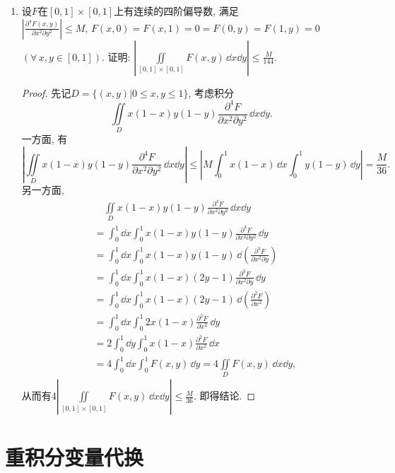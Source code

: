\begin{quizb}
\begin{enumerate}
\item 设\(F\)在\([0,1]\times [0,1]\)上有连续的四阶偏导数, 
满足\(\left|\frac{\partial^4F(x,y)}{\partial x^2\partial y^2}\right|\leqslant M,\,F(x,0)=F(x,1)=0=F(0,y)=F(1,y)=0\) \((\forall\, x,y\in[0,1])\). 
证明: \(\left|\iint\limits_{[0,1]\times [0,1]}F(x,y)\,\dd x\dd y\right|\leqslant\frac{M}{144}\).
\begin{proof}
先记\(D=\{(x,y)\big|0\leqslant x,y\leqslant 1\}\), 
考虑积分\[\iint\limits_{D}x(1-x)y(1-y)\frac{\partial^4F}{\partial x^2\partial y^2}\,\dd x\dd y.\]
一方面, 有
\[\left|\iint\limits_{D}x(1-x)y(1-y)\frac{\partial^4F}{\partial x^2\partial y^2}\,\dd x\dd y\right|
\leqslant\left|M\int_{0}^{1}x(1-x)\,\dd x\int_{0}^{1}y(1-y)\,\dd y\right|
=\frac{M}{36}.\]另一方面,\[\begin{split}
&\quad\iint\limits_{D}x(1-x)y(1-y)\frac{\partial^4F}{\partial x^2\partial y^2}\,\dd x\dd y\\
&=\int_{0}^{1}\dd x\int_{0}^{1}x(1-x)y(1-y)\frac{\partial^4F}{\partial x^2\partial y^2}\,\dd y\\
&=\int_{0}^{1}\dd x\int_{0}^{1}x(1-x)y(1-y)\,\dd\left(\frac{\partial^3F}{\partial x^2\partial y}\right)\\
&=\int_{0}^{1}\dd x\int_{0}^{1}x(1-x)(2y-1)\frac{\partial^3F}{\partial x^2\partial y}\,\dd y\\
&=\int_{0}^{1}\dd x\int_{0}^{1}x(1-x)(2y-1)\,\dd\left(\frac{\partial^2F}{\partial x^2}\right)\\
&=\int_{0}^{1}\dd x\int_{0}^{1}2x(1-x)\frac{\partial^2F}{\partial x^2}\,\dd y\\
&=2\int_{0}^{1}\dd y\int_{0}^{1}x(1-x)\frac{\partial^2F}{\partial x^2}\,\dd x\\
&=4\int_{0}^{1}\dd x\int_{0}^{1}F(x,y)\,\dd y=4\iint\limits_{D}F(x,y)\,\dd x\dd y,
\end{split}\]
从而有\(4\left|\iint\limits_{[0,1]\times [0,1]}F(x,y)\,\dd x\dd y\right|
\leqslant\frac{M}{36}\). 即得结论.
\end{proof}
\end{enumerate}
\end{quizb}

\section{重积分变量代换}
